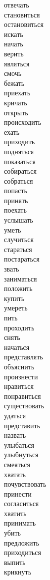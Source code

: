 \documentclass{article}
\begin{document}
\begin{multicols}{3}
отвечать \\
становиться \\
остановиться \\
искать \\
начать \\
верить \\
являться \\
смочь \\
бежать \\
приехать \\
кричать \\
открыть \\
происходить \\
ехать \\
приходить \\
подняться \\
показаться \\
собираться \\
собраться \\
попасть \\
принять \\
поехать \\
услышать \\
уметь \\
случиться \\
стараться \\
постараться \\
звать \\
заниматься \\
положить \\
купить \\
умереть \\
пить \\
проходить \\
снять \\
начаться \\
представлять \\
объяснить \\
произнести \\
нравиться \\
понравиться \\
существовать \\
удаться \\
представить \\
назвать \\
улыбаться \\
улыбнуться \\
смеяться \\
хватать \\
почувствовать \\
принести \\
согласиться \\
хватить \\
принимать \\
убить \\
предложить \\
приходиться \\
выпить \\
крикнуть \\

\end{multicols}
 
\end{document}

